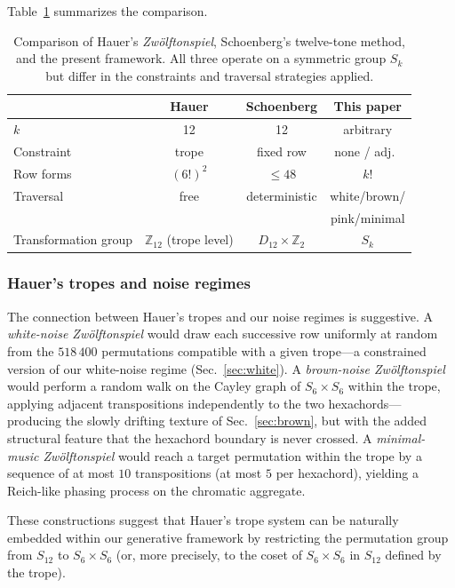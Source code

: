 \documentclass[
  twocolumn,
  aps,
  pra,
  showkeys,
  amsmath,amssymb,
  longbibliography
]{revtex4-2}
\begin{document}
Table~\ref{tab:hauer} summarizes the comparison.

\begin{table}[t]
\caption{Comparison of Hauer's \emph{Zw\"olftonspiel},
Schoenberg's twelve-tone method, and the present framework.
All three operate on a symmetric group $S_k$ but differ in the
constraints and traversal strategies applied.}
\label{tab:hauer}
\begin{ruledtabular}
\begin{tabular}{lccc}
 & Hauer & Schoenberg & This paper \\
\hline
$k$ & 12 & 12 & arbitrary \\
Constraint & trope & fixed row & none / adj.\ \\
Row forms & $(6!)^2$ & $\le 48$ & $k!$ \\
Traversal & free & deterministic & white/brown/ \\
 & & & pink/minimal \\
Transformation group & $\mathbb{Z}_{12}$ (trope level) & $D_{12}\!\times\!\mathbb{Z}_2$ & $S_k$ \\
\end{tabular}
\end{ruledtabular}
\end{table}

\subsubsection{Hauer's tropes and noise regimes}

The connection between Hauer's tropes and our noise regimes is
suggestive.
A \emph{white-noise Zw\"olftonspiel} would draw each successive
row uniformly at random from the $518\,400$ permutations
compatible with a given trope---a constrained version of our
white-noise regime (Sec.~\ref{sec:white}).
A \emph{brown-noise Zw\"olftonspiel} would perform a random walk
on the Cayley graph of $S_6\times S_6$ within the trope,
applying adjacent transpositions independently to the two
hexachords---producing the slowly drifting texture of
Sec.~\ref{sec:brown}, but with the added structural feature
that the hexachord boundary is never crossed.
A \emph{minimal-music Zw\"olftonspiel} would reach a target
permutation within the trope by a sequence of at most $10$
transpositions (at most $5$ per hexachord), yielding a
Reich-like phasing process on the chromatic aggregate.

These constructions suggest that Hauer's trope system can be
naturally embedded within our generative framework by
restricting the permutation group from $S_{12}$ to
$S_6\times S_6$ (or, more precisely, to the coset of
$S_6\times S_6$ in $S_{12}$ defined by the trope).
\end{document}
